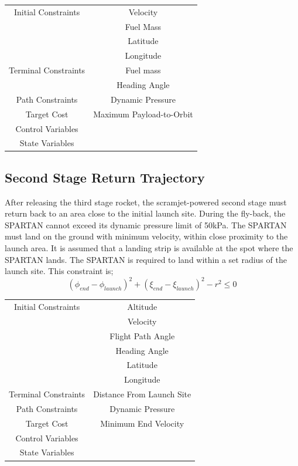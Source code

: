 \begin{tabular}{|c|c|}
	\hline Initial Constraints  & Velocity \\ & Fuel Mass  \\ & Latitude \\ & Longitude \\ 
	\hline Terminal Constraints & Fuel mass \\ & Heading Angle \\ 
	\hline Path Constraints & Dynamic Pressure \\ 
	\hline Target Cost & Maximum Payload-to-Orbit \\ 
			\hline Control Variables &  \\ 
			\hline State Variables &  \\ 
	\hline 
\end{tabular} 



\subsection{Second Stage Return Trajectory}
After releasing the third stage rocket, the scramjet-powered second stage must return back to an area close to the initial launch site.
During the fly-back, the SPARTAN cannot exceed its dynamic pressure limit of 50kPa. 
The SPARTAN must land on the ground with minimum velocity, within close proximity to the launch area. It is assumed that a landing strip is available at the spot where the SPARTAN lands. The SPARTAN is required to land within a set radius of the launch site. This constraint is;
\begin{equation}
(\phi_{end} - \phi_{launch})^2 + (\xi_{end} - \xi_{launch})^2 - r^2 \leq 0
\end{equation}


\begin{tabular}{|c|c|}
	\hline Initial Constraints  & Altitude \\ & Velocity\\ & Flight Path Angle\\ & Heading Angle\\ & Latitude\\ & Longitude\\ 
	\hline Terminal Constraints &  Distance From Launch Site \\ 
	\hline Path Constraints & Dynamic Pressure \\ 
	\hline Target Cost & Minimum End Velocity \\ 
				\hline Control Variables &  \\ 
				\hline State Variables &  \\ 
	\hline 
\end{tabular} 




